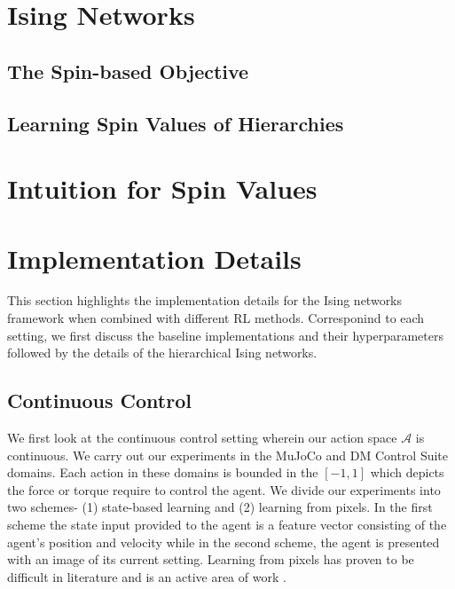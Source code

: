 \documentclass{article}
\begin{document}
\section{Ising Networks}

\subsection{The Spin-based Objective}

\subsection{Learning Spin Values of Hierarchies}

\section{Intuition for Spin Values}

\section{Implementation Details}
This section highlights the implementation details for the Ising networks framework when combined with different RL methods. Corresponind to each setting, we first discuss the baseline implementations and their hyperparameters followed by the details of the hierarchical Ising networks. 

\subsection{Continuous Control}
We first look at the continuous control setting wherein our action space $\mathcal{A}$ is continuous. We carry out our experiments in the MuJoCo \cite{mujoco} and DM Control Suite \cite{dm} domains. Each action in these domains is bounded in the $[-1,1]$ which depicts the force or torque require to control the agent. We divide our experiments into two schemes- (1) state-based learning and (2) learning from pixels. In the first scheme the state input provided to the agent is a feature vector consisting of the agent's position and velocity while in the second scheme, the agent is presented with an image of its current setting. Learning from pixels has proven to be difficult in literature \cite{dm,dreamer} and is an active area of work \cite{rad,curl}.
\end{document}

